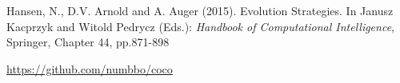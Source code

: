 \begin{thebibliography}{1}

Hansen, N., D.V. Arnold and A. Auger (2015). Evolution Strategies. In Janusz Kacprzyk and Witold Pedrycz (Eds.): \emph{Handbook of Computational Intelligence}, Springer, Chapter 44, pp.871-898 

\url{https://github.com/numbbo/coco}


\end{thebibliography}